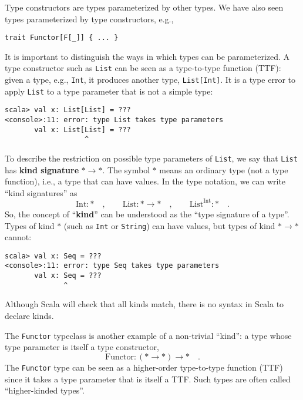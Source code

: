 Type constructors are types parameterized by other types. We have
also seen types parameterized by type constructors, e.g.,
\begin{lstlisting}
trait Functor[F[_]] { ... }
\end{lstlisting}
It is important to distinguish the ways in which types can be parameterized.
A type constructor such as \lstinline!List! can be seen as a type-to-type
function (TTF): given a type, e.g., \lstinline!Int!, it produces
another type, \lstinline!List[Int]!. It is a type error to apply
\lstinline!List! to a type parameter that is not a simple type:
\begin{lstlisting}
scala> val x: List[List] = ???
<console>:11: error: type List takes type parameters
       val x: List[List] = ???
                   ^
\end{lstlisting}
To describe the restriction on possible type parameters of \lstinline!List!,
we say that \lstinline!List! has \textbf{kind signature}
$*\rightarrow*$. The symbol $*$ means an ordinary type (not a type
function), i.e., a type that can have values. In the type notation,
we can write \textsf{``}kind signatures\textsf{''} as
\[
\text{Int}:*\quad,\quad\quad\text{List}:*\rightarrow*\quad,\quad\quad\text{List}^{\text{Int}}:*\quad.
\]
So, the concept of \textsf{``}\textbf{kind}\textsf{''} can be understood as the \textsf{``}type
signature of a type\textsf{''}. Types of kind $*$ (such as \lstinline!Int!
or \lstinline!String!) can have values, but types of kind $*\rightarrow*$
cannot:
\begin{lstlisting}
scala> val x: Seq = ???
<console>:11: error: type Seq takes type parameters
       val x: Seq = ???
              ^
\end{lstlisting}
Although Scala will check that all kinds match, there is no syntax
in Scala to declare kinds.

The \lstinline!Functor! typeclass is another example of a non-trivial
\textsf{``}kind\textsf{''}: a type whose type parameter is itself a type constructor,
\[
\text{Functor}:(*\rightarrow*)\rightarrow*\quad.
\]
The \lstinline!Functor! type can be seen as a higher-order type-to-type
function (TTF) since it takes a type parameter that is itself a TTF.
Such types are often called \textsf{``}higher-kinded types\textsf{''}.


